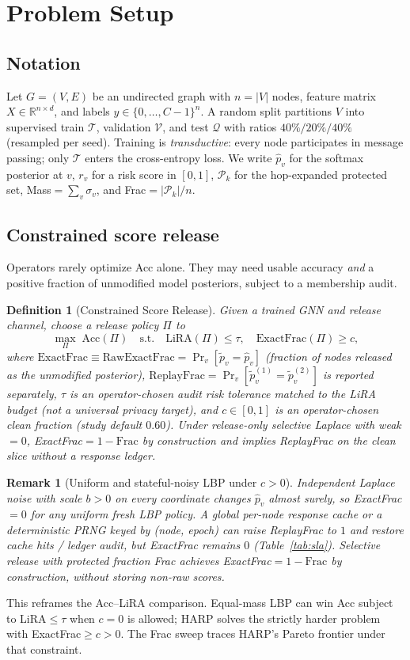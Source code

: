 \documentclass[conference]{IEEEtran}
\newtheorem{remark}{Remark}
\newtheorem{definition}{Definition}
\begin{document}
\section{Problem Setup}
\label{sec:setup}

\subsection{Notation}
Let $G=(V,E)$ be an undirected graph with $n=|V|$ nodes, feature matrix $X\in\mathbb{R}^{n\times d}$, and labels $y\in\{0,\ldots,C-1\}^n$.
A random split partitions $V$ into supervised train $\mathcal{T}$, validation $\mathcal{V}$, and test $\mathcal{Q}$ with ratios $40\%/20\%/40\%$ (resampled per seed).
Training is \emph{transductive}: every node participates in message passing; only $\mathcal{T}$ enters the cross-entropy loss.
We write $\hat p_v$ for the softmax posterior at $v$, $r_v$ for a risk score in $[0,1]$, $\mathcal{P}_k$ for the hop-expanded protected set, Mass$=\sum_v\sigma_v$, and Frac$=|\mathcal{P}_k|/n$.

\subsection{Constrained score release}
Operators rarely optimize Acc alone.
They may need usable accuracy \emph{and} a positive fraction of unmodified model posteriors, subject to a membership audit.
\begin{definition}[Constrained Score Release]
Given a trained GNN and release channel, choose a release policy $\Pi$ to
\[
\max_{\Pi}\; \mathrm{Acc}(\Pi)
\quad\text{s.t.}\quad
\mathrm{LiRA}(\Pi)\le \tau,
\quad
\mathrm{ExactFrac}(\Pi)\ge c,
\]
where $\mathrm{ExactFrac}\equiv\mathrm{RawExactFrac}=\Pr_v[\tilde p_v=\hat p_v]$ (fraction of nodes released as the unmodified posterior), $\mathrm{ReplayFrac}=\Pr_v[\tilde p_v^{(1)}=\tilde p_v^{(2)}]$ is reported separately, $\tau$ is an \emph{operator-chosen} audit risk tolerance matched to the LiRA budget (not a universal privacy target), and $c\in[0,1]$ is an operator-chosen clean fraction (study default $0.60$).
Under release-only selective Laplace with weak${=}0$, ExactFrac${=}1-\mathrm{Frac}$ by construction and implies ReplayFrac on the clean slice without a response ledger.
\end{definition}

\begin{remark}[Uniform and stateful-noisy LBP under $c{>}0$]
\label{rem:uniform-infeasible}
Independent Laplace noise with scale $b{>}0$ on every coordinate changes $\hat p_v$ almost surely, so ExactFrac$=0$ for any uniform fresh LBP policy.
A global per-node response cache or a deterministic PRNG keyed by (node, epoch) can raise ReplayFrac to $1$ and restore cache hits / ledger audit, but ExactFrac remains $0$ (Table~\ref{tab:sla}).
Selective release with protected fraction Frac achieves ExactFrac$=1-\mathrm{Frac}$ by construction, without storing non-raw scores.
\end{remark}
This reframes the Acc--LiRA comparison.
Equal-mass LBP can win Acc subject to LiRA$\le\tau$ when $c{=}0$ is allowed; HARP solves the strictly harder problem with ExactFrac$\ge c{>}0$.
The Frac sweep traces HARP's Pareto frontier under that constraint.
\end{document}
